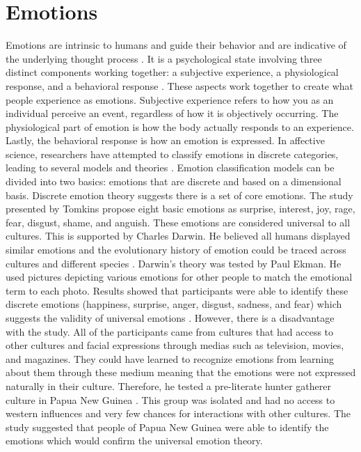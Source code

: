 \section{Emotions}
Emotions are intrinsic to humans and guide their behavior and are indicative of the underlying thought process \cite{emotions1-minsky2007emotion}. It is a psychological state involving three distinct components working together: a subjective experience, a physiological response, and a behavioral response \cite{emotions2-LEDOUX201867}. These aspects work together to create what people experience as emotions. Subjective experience refers to how you as an individual perceive an event, regardless of how it is objectively occurring. The physiological part of emotion is how the body actually responds to an experience. Lastly, the behavioral response is how an emotion is expressed. In affective science, researchers have attempted to classify emotions in discrete categories, leading to several models and theories \cite{cross_cultural}. Emotion classification models can be divided into two basics: emotions that are discrete and based on a dimensional basis. Discrete emotion theory suggests there is a set of core emotions. The study presented by Tomkins \cite{emotions3-tomkins1962affect} propose eight basic emotions as surprise, interest, joy, rage, fear, disgust, shame, and anguish. These emotions are considered universal to all cultures. This is supported by Charles Darwin. He believed all humans displayed similar emotions and the evolutionary history of emotion could be traced across cultures and different species \cite{emotions4-darwin1998expression}. Darwin's theory was tested by Paul Ekman. He used pictures depicting various emotions for other people to match the emotional term to each photo. Results showed that participants were able to identify these discrete emotions (happiness, surprise, anger, disgust, sadness, and fear) which suggests the validity of universal emotions \cite{emotions5-ekman1999basic}. However, there is a disadvantage with the study. All of the participants came from cultures that had access to other cultures and facial expressions through medias such as television, movies, and magazines. They could have learned to recognize emotions from learning about them through these medium meaning that the emotions were not expressed naturally in their culture. Therefore, he tested a pre-literate hunter gatherer culture in Papua New Guinea \cite{emotions6-ekman1993facial}. This group was isolated and had no access to western influences and very few chances for interactions with other cultures. The study suggested that people of Papua New Guinea were able to identify the emotions which would confirm the universal emotion theory. 

